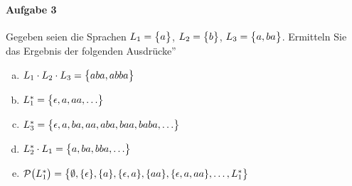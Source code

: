 \documentclass{scrreprt}
\begin{document}
\paragraph{Aufgabe 3} Gegeben seien die Sprachen $L_1 = \qty\big{a}$,
$L_2 = \qty\big{b}$, $L_3 = \qty\big{a, ba}$.
Ermitteln Sie das Ergebnis der folgenden Ausdrücke''
\begin{enumerate}[(a)]
\item $L_1 \cdot L_2 \cdot L_3 = \qty\big{aba, abba}$
\item $L_1^* = \qty\big{\epsilon, a, aa, \ldots}$
\item $L_3^* = \qty\big{\epsilon, a, ba, aa, aba, baa, baba, \ldots}$
\item $L_2^* \cdot L_1 = \qty\big{a, ba, bba, \ldots}$
\item $\mathcal{P}\qty\big(L_1^*)
  = \qty\big{\emptyset, \qty{\epsilon}, \qty{a}, \qty{\epsilon, a}, \qty{aa},
      \qty{\epsilon, a, aa}, \ldots, L_1^*}$
\end{enumerate}
\end{document}
